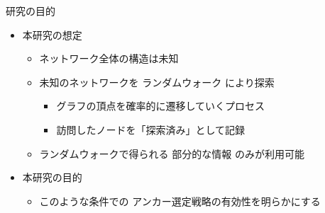 \documentclass[compress,dvipdfmx,11pt]{beamer}
\begin{document}
\begin{frame}[label={sec:orgb9b5a98}]{研究の目的}
\begin{itemize}
\item 本研究の想定
\begin{itemize}
\item ネットワーク全体の構造は未知
\item 未知のネットワークを \alert{ランダムウォーク} により探索
\begin{itemize}
\item グラフの頂点を確率的に遷移していくプロセス
\item 訪問したノードを「探索済み」として記録
\end{itemize}
\item ランダムウォークで得られる \alert{部分的な情報} のみが利用可能
\end{itemize}
\end{itemize}

\vspace{3mm}

\begin{itemize}
\item 本研究の目的
\begin{itemize}
\item このような条件での \alert{アンカー選定戦略の有効性}を明らかにする
\end{itemize}
\end{itemize}
\end{frame}
\end{document}
